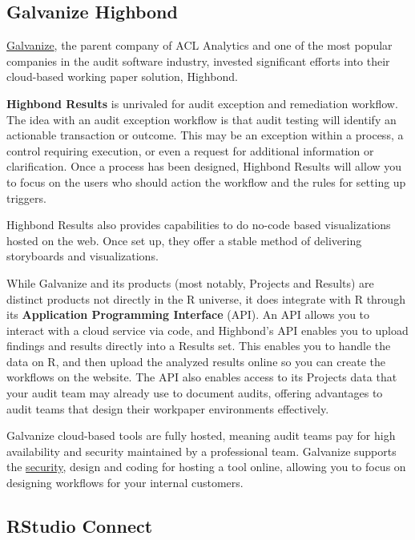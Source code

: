 \documentclass[
]{book}
\begin{document}
\hypertarget{galvanize-highbond}{%
\subsection{Galvanize Highbond}\label{galvanize-highbond}}

\href{https://www.wegalvanize.com}{Galvanize}, the parent company of ACL Analytics and one of the most popular companies in the audit software industry, invested significant efforts into their cloud-based working paper solution, Highbond.

\textbf{Highbond Results} is unrivaled for audit exception and remediation workflow. The idea with an audit exception workflow is that audit testing will identify an actionable transaction or outcome. This may be an exception within a process, a control requiring execution, or even a request for additional information or clarification. Once a process has been designed, Highbond Results will allow you to focus on the users who should action the workflow and the rules for setting up triggers.

Highbond Results also provides capabilities to do no-code based visualizations hosted on the web. Once set up, they offer a stable method of delivering storyboards and visualizations.

While Galvanize and its products (most notably, Projects and Results) are distinct products not directly in the R universe, it does integrate with R through its \textbf{Application Programming Interface} (API). An API allows you to interact with a cloud service via code, and Highbond's API enables you to upload findings and results directly into a Results set. This enables you to handle the data on R, and then upload the analyzed results online so you can create the workflows on the website. The API also enables access to its Projects data that your audit team may already use to document audits, offering advantages to audit teams that design their workpaper environments effectively.

Galvanize cloud-based tools are fully hosted, meaning audit teams pay for high availability and security maintained by a professional team. Galvanize supports the \href{https://www.wegalvanize.com/trust/}{security}, design and coding for hosting a tool online, allowing you to focus on designing workflows for your internal customers.

\hypertarget{rstudio-connect}{%
\subsection{RStudio Connect}\label{rstudio-connect}}
\end{document}
